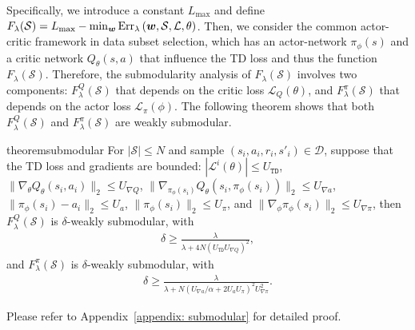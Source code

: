 Specifically, we introduce a constant $L_{\max}$ and define 
$F_{\lambda}(\mathcal{S})=L_{\max} - \min_{{\bm{w}}}\operatorname{Err}_{\lambda}\left({\bm{w}}, \mathcal{S}, \mathcal L, \theta\right)$. 
Then, we consider the common actor-critic framework in data subset selection, which has an actor-network $\pi_{\phi}(s)$ and a critic network $Q_{\theta}(s, a)$ that influence the TD loss and thus the function $F_{\lambda}(\mathcal{S})$. Therefore, the submodularity analysis of  $F_{\lambda}(\mathcal{S})$ involves two components: $F_\lambda^Q(\mathcal{S})$ that depends on the critic loss $\mathcal{L}_Q(\theta)$, and $F_\lambda^\pi(\mathcal{S})$ that depends on the actor loss $\mathcal{L}_\pi(\phi)$. The following theorem shows that both $F_\lambda^Q(\mathcal{S})$ and $F_\lambda^\pi(\mathcal{S})$ are weakly submodular.




\begin{restatable}{theorem}{submodular}
    For $|\mathcal S| \leq N$ and sample $(s_i,a_i,r_i,s'_i)\in \mathcal{D}$, suppose that the TD loss and gradients are bounded: $|\mathcal{L}^i(\theta)| \leq U_\mathtt{TD}$, $ \|\nabla_\theta Q_\theta(s_i,a_i)\|_2 \leq U_{\nabla Q}$, $\|\nabla_{\pi_{\phi}(s_i)}Q_\theta(s_i,\pi_{\phi}(s_i))\|_2 \leq U_{\nabla a}$, $\|\pi_{\phi}(s_i)-a_i\|_2 \leq U_a$, $\|\pi_{\phi}(s_i)\|_2\leq U_\pi$, and $\|\nabla_\phi \pi_{\phi}(s_i)\|_2 \leq U_{\nabla\pi}$, then $F_\lambda^Q(\mathcal{S})$ is $\delta$-weakly submodular, with
    \begin{align}
        \delta \geq \frac{\lambda}{\lambda+4 N (U_\mathtt{TD}U_{\nabla Q})^2},
    \end{align}
    and $F_\lambda^\pi(\mathcal{S})$ is $\delta$-weakly submodular, with 
    \begin{align}
        \delta \geq \frac{\lambda}{\lambda + N(U_{\nabla a}/\alpha+2U_a U_\pi)^2 U_{\nabla\pi}^2}.
    \end{align}
    \label{thm: submodular}
\end{restatable}
Please refer to Appendix~\ref{appendix: submodular} for detailed proof. 

